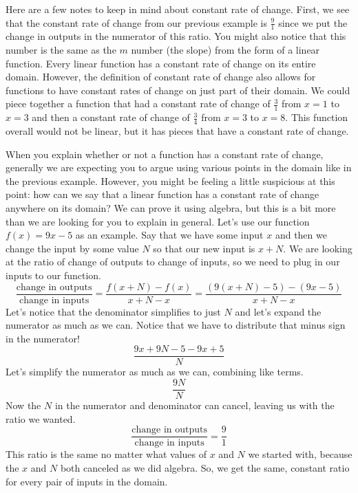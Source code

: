 \documentclass{ximera}
\begin{document}
Here are a few notes to keep in mind about constant rate of change. First, we see that the constant rate of change from our previous example is $\frac{9}{1}$ since we put the change in outputs in the numerator of this ratio. You might also notice that this number is the same as the $m$ number (the slope) from the form of a linear function. Every linear function has a constant rate of change on its entire domain. However, the definition of constant rate of change also allows for functions to have constant rates of change on just part of their domain. We could piece together a function that had a constant rate of change of $\frac{3}{1}$ from $x=1$ to $x=3$ and then a constant rate of change of $\frac{3}{4}$ from $x=3$ to $x=8$. This function overall would not be linear, but it has pieces that have a constant rate of change.

When you explain whether or not a function has a constant rate of change, generally we are expecting you to argue using various points in the domain like in the previous example. However, you might be feeling a little suspicious at this point: how can we say that a linear function has a constant rate of change anywhere on its domain? We can prove it using algebra, but this is a bit more than we are looking for you to explain in general. Let's use our function $f(x) = 9x-5$ as an example. Say that we have some input $x$ and then we change the input by some value $N$ so that our new input is $x+N$. We are looking at the ratio of change of outputs to change of inputs, so we need to plug in our inputs to our function.
\[
\frac{\textrm{change in outputs}}{\textrm{change in inputs}} = \frac{f(x+N)-f(x)}{x+N-x} = \frac{(9(x+N)-5)-(9x-5)}{x+N-x}
\]
Let's notice that the denominator simplifies to just $N$ and let's expand the numerator as much as we can. Notice that we have to distribute that minus sign in the numerator!
\[
\frac{9x+9N-5-9x+5}{N}
\]
Let's simplify the numerator as much as we can, combining like terms.
\[
\frac{9N}{N}
\]
Now the $N$ in the numerator and denominator can cancel, leaving us with the ratio we wanted.
\[
\frac{\textrm{change in outputs}}{\textrm{change in inputs}} = \frac{9}{1}
\]
This ratio is the same no matter what values of $x$ and $N$ we started with, because the $x$ and $N$ both canceled as we did algebra. So, we get the same, constant ratio for every pair of inputs in the domain.
\end{document}
